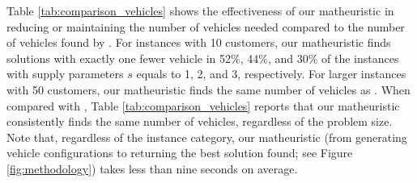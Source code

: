 \documentclass[11pt]{elsarticle}
\theoremstyle{plain}
\begin{document}
\begin{table}[htbp]
  \centering
  \caption{Comparison between the number of vehicles obtained by our matheuristic and those of \cite{henke2015multi} and \cite{henke2019branch}.}
  \label{tab:comparison_vehicles}%
\end{table}%

Table \ref{tab:comparison_vehicles} shows the effectiveness of our matheuristic in reducing or maintaining the number of vehicles needed compared to the number of vehicles found by \cite{henke2015multi}. For instances with 10 customers, our matheuristic finds solutions with exactly one fewer vehicle in 52\%, 44\%, and 30\% of the instances with supply parameters $s$ equals to 1, 2, and 3, respectively. For larger instances with 50 customers, our matheuristic finds the same number of vehicles as \cite{henke2015multi}.
When compared with \cite{henke2019branch}, Table \ref{tab:comparison_vehicles} reports that our matheuristic consistently finds the same number of vehicles, regardless of the problem size.
Note that, regardless of the instance category, our matheuristic (from generating vehicle configurations to returning the best solution found; see Figure \ref{fig:methodology}) takes less than nine seconds on average.
\end{document}
